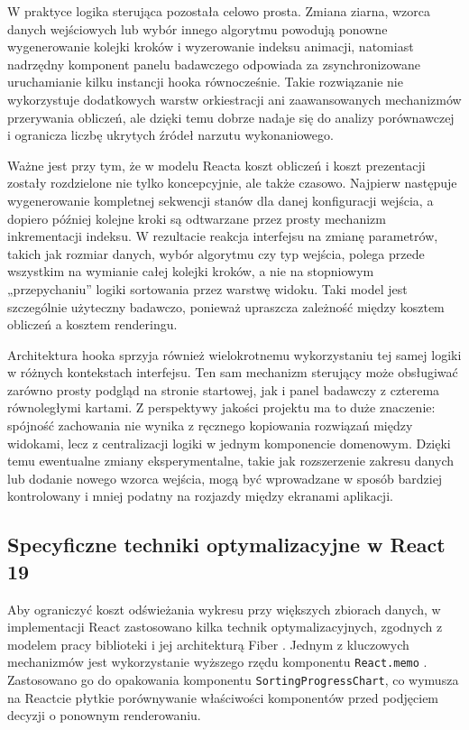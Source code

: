 \documentclass[12pt,openright,twoside]{report}
\begin{document}
W praktyce logika sterująca pozostała celowo prosta. Zmiana ziarna, wzorca danych wejściowych lub wybór innego algorytmu powodują ponowne wygenerowanie kolejki kroków i wyzerowanie indeksu animacji, natomiast nadrzędny komponent panelu badawczego odpowiada za zsynchronizowane uruchamianie kilku instancji hooka równocześnie. Takie rozwiązanie nie wykorzystuje dodatkowych warstw orkiestracji ani zaawansowanych mechanizmów przerywania obliczeń, ale dzięki temu dobrze nadaje się do analizy porównawczej i ogranicza liczbę ukrytych źródeł narzutu wykonaniowego.

Ważne jest przy tym, że w modelu Reacta koszt obliczeń i koszt prezentacji zostały rozdzielone nie tylko koncepcyjnie, ale także czasowo. Najpierw następuje wygenerowanie kompletnej sekwencji stanów dla danej konfiguracji wejścia, a dopiero później kolejne kroki są odtwarzane przez prosty mechanizm inkrementacji indeksu. W rezultacie reakcja interfejsu na zmianę parametrów, takich jak rozmiar danych, wybór algorytmu czy typ wejścia, polega przede wszystkim na wymianie całej kolejki kroków, a nie na stopniowym „przepychaniu” logiki sortowania przez warstwę widoku. Taki model jest szczególnie użyteczny badawczo, ponieważ upraszcza zależność między kosztem obliczeń a kosztem renderingu.

Architektura hooka sprzyja również wielokrotnemu wykorzystaniu tej samej logiki w różnych kontekstach interfejsu. Ten sam mechanizm sterujący może obsługiwać zarówno prosty podgląd na stronie startowej, jak i panel badawczy z czterema równoległymi kartami. Z perspektywy jakości projektu ma to duże znaczenie: spójność zachowania nie wynika z ręcznego kopiowania rozwiązań między widokami, lecz z centralizacji logiki w jednym komponencie domenowym. Dzięki temu ewentualne zmiany eksperymentalne, takie jak rozszerzenie zakresu danych lub dodanie nowego wzorca wejścia, mogą być wprowadzane w sposób bardziej kontrolowany i mniej podatny na rozjazdy między ekranami aplikacji.

\subsection{Specyficzne techniki optymalizacyjne w React 19}
Aby ograniczyć koszt odświeżania wykresu przy większych zbiorach danych, w implementacji React zastosowano kilka technik optymalizacyjnych, zgodnych z modelem pracy biblioteki i jej architekturą Fiber \cite{React_Fiber_Arch}. Jednym z kluczowych mechanizmów jest wykorzystanie wyższego rzędu komponentu \texttt{React.memo} \cite{React_Official}. Zastosowano go do opakowania komponentu \texttt{SortingProgressChart}, co wymusza na Reactcie płytkie porównywanie właściwości komponentów przed podjęciem decyzji o ponownym renderowaniu.
\end{document}
